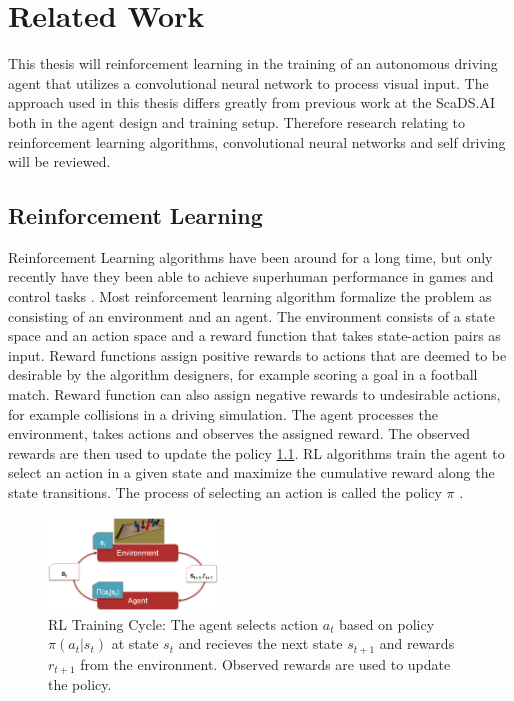 \chapter{Related Work}
\label{cha:Related Work}

This thesis will reinforcement learning in the training of an autonomous driving agent that utilizes a convolutional neural network to process visual input. The approach used in this thesis differs greatly from previous work at the ScaDS.AI \autocite{maximilian} both in the agent design and training setup. Therefore research relating to reinforcement learning algorithms, convolutional neural networks and self driving will be reviewed. 



\section{Reinforcement Learning}

Reinforcement Learning algorithms have been around for a long time, but only recently have they been able to achieve superhuman performance in games and control tasks \autocite{atari}. Most reinforcement learning algorithm formalize the problem as consisting of an environment and an agent. The environment consists of a state space and an action space and a reward function that takes state-action pairs as input. Reward functions assign positive rewards to actions that are deemed to be desirable by the algorithm designers, for example scoring a goal in a football match. Reward function can also assign negative rewards to undesirable actions, for example collisions in a driving simulation. The agent processes the environment, takes actions and observes the assigned reward. The observed rewards are then used to update the policy \ref{rlcycle}. RL algorithms train the agent to select an action in a given state and maximize the cumulative reward along the state transitions. The process of selecting an action is called the policy $\pi$ \autocite{rlbook2020}. 

\begin{figure}
    \centering
    \includegraphics[width=0.4\textwidth]{Bilder/rl_cycle.png}
    \caption{RL Training Cycle: The agent selects action $a_t$ based on policy $\pi(a_t|s_t)$ at state $s_t$ and recieves the next state $s_{t+1}$ and rewards $r_{t+1}$ from the environment. Observed rewards are used to update the policy.}
    \label{rlcycle}
\end{figure}

